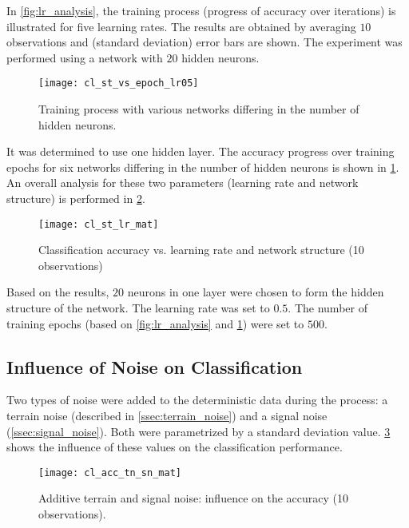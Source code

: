 In \cref{fig:lr_analysis}, the training process (progress of accuracy over iterations) is illustrated for five learning rates. The results are obtained by averaging $ 10 $ observations and (standard deviation) error bars are shown. The experiment was performed using a network with $ 20 $ hidden neurons.

\begin{figure}[H]
  \centering
  \texttt{[image: cl\_st\_vs\_epoch\_lr05]}
  \caption{Training process with various networks differing in the number of hidden neurons.}
  \label{fig:st_analysis}
\end{figure}

It was determined to use one hidden layer. The accuracy progress over training epochs for six networks differing in the number of hidden neurons is shown in \cref{fig:st_analysis}. An overall analysis for these two parameters (learning rate and network structure) is performed in \cref{fig:acc_st_lr_mat}.

\begin{figure}[H]
  \centering
  \texttt{[image: cl\_st\_lr\_mat]}
  \caption{Classification accuracy vs. learning rate and network structure (10 observations)}
  \label{fig:acc_st_lr_mat}
\end{figure}

Based on the results, $ 20 $ neurons in one layer were chosen to form the hidden structure of the network. The learning rate was set to $ 0.5 $. The number of training epochs (based on \cref{fig:lr_analysis} and \cref{fig:st_analysis}) were set to $ 500 $.

\subsection{Influence of Noise on Classification} \label{ssec:influence_of_noise_on_classification}
Two types of noise were added to the deterministic data during the process: a terrain noise (described in \cref{ssec:terrain_noise}) and a signal noise (\cref{ssec:signal_noise}). Both were parametrized by a standard deviation value. \cref{fig:acc_tn_sn_mat} shows the influence of these values on the classification performance.

\begin{figure}[H]
  \centering
  \texttt{[image: cl\_acc\_tn\_sn\_mat]}
  \caption{Additive terrain and signal noise: influence on the accuracy (10 observations).}
  \label{fig:acc_tn_sn_mat}
\end{figure}

